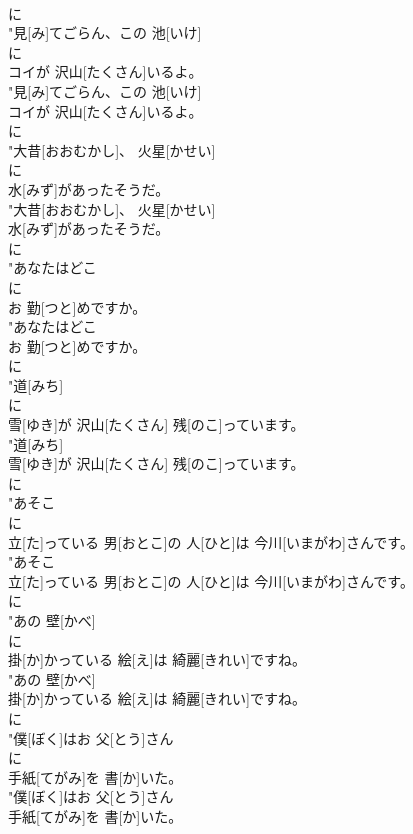 \documentclass[8pt]{extreport}
\begin{document}
\begin{CJK}{UTF8}{min}
\\	に
\\	"見[み]てごらん、この 池[いけ]
\\	に
\\	コイが 沢山[たくさん]いるよ。
\\	"見[み]てごらん、この 池[いけ]
\\	コイが 沢山[たくさん]いるよ。
\\	に
\\	"大昔[おおむかし]、 火星[かせい]
\\	に
\\	水[みず]があったそうだ。
\\	"大昔[おおむかし]、 火星[かせい]
\\	水[みず]があったそうだ。
\\	に
\\	"あなたはどこ
\\	に
\\	お 勤[つと]めですか。
\\	"あなたはどこ
\\	お 勤[つと]めですか。
\\	に
\\	"道[みち]
\\	に
\\	雪[ゆき]が 沢山[たくさん] 残[のこ]っています。
\\	"道[みち]
\\	雪[ゆき]が 沢山[たくさん] 残[のこ]っています。
\\	に
\\	"あそこ
\\	に
\\	立[た]っている 男[おとこ]の 人[ひと]は 今川[いまがわ]さんです。
\\	"あそこ
\\	立[た]っている 男[おとこ]の 人[ひと]は 今川[いまがわ]さんです。
\\	に
\\	"あの 壁[かべ]
\\	に
\\	掛[か]かっている 絵[え]は 綺麗[きれい]ですね。
\\	"あの 壁[かべ]
\\	掛[か]かっている 絵[え]は 綺麗[きれい]ですね。
\\	に
\\	"僕[ぼく]はお 父[とう]さん
\\	に
\\	手紙[てがみ]を 書[か]いた。
\\	"僕[ぼく]はお 父[とう]さん
\\	手紙[てがみ]を 書[か]いた。

\end{CJK}
\end{document}
